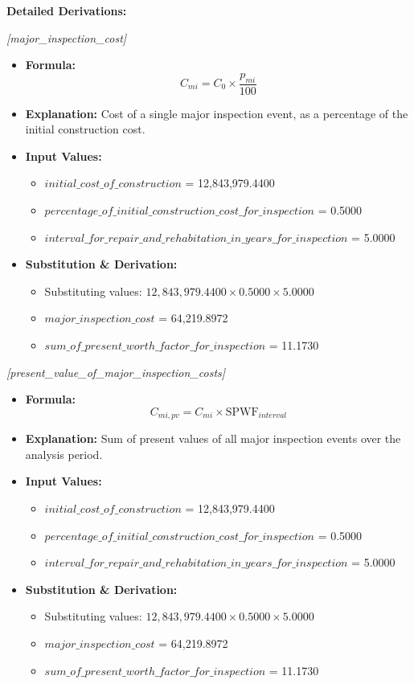 \documentclass[12pt,a4paper]{article}
\begin{document}
\textbf{Detailed Derivations:}


\textit{[major\_inspection\_cost]}

\begin{itemize}
  \item \textbf{Formula:} $$C_{mi} = C_0 \times \frac{p_{mi}}{100}$$
  \item \textbf{Explanation:} Cost of a single major inspection event, as a percentage of the initial construction cost.
  \item \textbf{Input Values:}
  \begin{itemize}
    \item $initial\_cost\_of\_construction$ = 12,843,979.4400
    \item $percentage\_of\_initial\_construction\_cost\_for\_inspection$ = 0.5000
    \item $interval\_for\_repair\_and\_rehabitation\_in\_years\_for\_inspection$ = 5.0000
  \end{itemize}
  \item \textbf{Substitution \& Derivation:}
  \begin{itemize}
    \item Substituting values: $12,843,979.4400 \times 0.5000 \times 5.0000$
    \item $major\_inspection\_cost$ = 64,219.8972
    \item $sum\_of\_present\_worth\_factor\_for\_inspection$ = 11.1730
  \end{itemize}
\end{itemize}


\textit{[present\_value\_of\_major\_inspection\_costs]}

\begin{itemize}
  \item \textbf{Formula:} $$C_{mi,pv} = C_{mi} \times \text{SPWF}_{interval}$$
  \item \textbf{Explanation:} Sum of present values of all major inspection events over the analysis period.
  \item \textbf{Input Values:}
  \begin{itemize}
    \item $initial\_cost\_of\_construction$ = 12,843,979.4400
    \item $percentage\_of\_initial\_construction\_cost\_for\_inspection$ = 0.5000
    \item $interval\_for\_repair\_and\_rehabitation\_in\_years\_for\_inspection$ = 5.0000
  \end{itemize}
  \item \textbf{Substitution \& Derivation:}
  \begin{itemize}
    \item Substituting values: $12,843,979.4400 \times 0.5000 \times 5.0000$
    \item $major\_inspection\_cost$ = 64,219.8972
    \item $sum\_of\_present\_worth\_factor\_for\_inspection$ = 11.1730
  \end{itemize}
\end{itemize}
\end{document}
